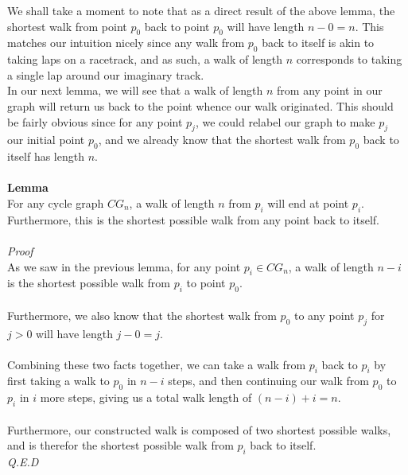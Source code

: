 \documentclass[a4paper,12pt]{article}
\begin{document}
We shall take a moment to note that as a direct result of the above lemma, the shortest walk from point $p_0$ back to point $p_0$ will have length $n - 0 = n$. This matches our intuition nicely since any walk from $p_0$ back to itself is akin to taking laps on a racetrack, and as such, a walk of length $n$ corresponds to taking a single lap around our imaginary track.\\

In our next lemma, we will see that a walk of length $n$ from any point in our graph will return us back to the point whence our walk originated. This should be fairly obvious since for any point $p_j$, we could relabel our graph to make $p_j$ our initial point $p_0$, and we already know that the shortest walk from $p_0$ back to itself has length $n$.\\
\\
\textbf{Lemma}\\
For any cycle graph $CG_n$, a walk of length $n$ from $p_i$ will end at point $p_i$. Furthermore, this is the shortest possible walk from any point back to itself.\\
\\
\textit{Proof}\\
As we saw in the previous lemma, for any point $p_i \in CG_n$, a walk of length $n - i$ is the shortest possible walk from $p_i$ to point $p_0$.\\
\\
Furthermore, we also know that the shortest walk from $p_0$ to any point $p_j$ for $j > 0$ will have length $j - 0 = j$.\\
\\
Combining these two facts together, we can take a walk from $p_i$ back to $p_i$ by first taking a walk to $p_0$ in $n - i$ steps, and then continuing our walk from $p_0$ to $p_i$ in $i$ more steps, giving us a total walk length of $(n - i) + i = n$.\\
\\
Furthermore, our constructed walk is composed of two shortest possible walks, and is therefor the shortest possible walk from $p_i$ back to itself.\\
\textit{Q.E.D}\\
\\
\end{document}
